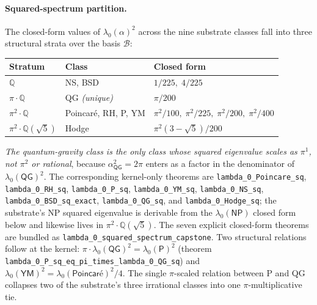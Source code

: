 \documentclass[11pt,a4paper]{amsart}
\theoremstyle{plain}
\theoremstyle{definition}
\begin{document}
\paragraph{Squared-spectrum partition.} The closed-form values of $\lambda_0(\alpha)^2$ across the nine substrate classes fall into three structural strata over the basis $\mathcal{B}$:
\begin{center}
\begin{tabular}{lll}
\toprule
Stratum & Class & Closed form \\
\midrule
$\mathbb{Q}$           & NS, BSD                                       & $1/225,\;4/225$ \\
$\pi\cdot\mathbb{Q}$   & QG \emph{(unique)}                           & $\pi/200$ \\
$\pi^2\cdot\mathbb{Q}$ & Poincar\'e, RH, P, YM                         & $\pi^2/100,\;\pi^2/225,\;\pi^2/200,\;\pi^2/400$ \\
$\pi^2\cdot\mathbb{Q}(\sqrt{5})$ & Hodge                              & $\pi^2(3-\sqrt{5})/200$ \\
\bottomrule
\end{tabular}
\end{center}
\textit{The quantum-gravity class is the only class whose squared eigenvalue scales as $\pi^1$, not $\pi^2$ or rational}, because $\alpha_{\textsf{QG}}^2 = 2\pi$ enters as a factor in the denominator of $\lambda_0(\textsf{QG})^2$. The corresponding kernel-only theorems are \texttt{lambda\_0\_Poincare\_sq}, \texttt{lambda\_0\_RH\_sq}, \texttt{lambda\_0\_P\_sq}, \texttt{lambda\_0\_YM\_sq}, \texttt{lambda\_0\_NS\_sq}, \texttt{lambda\_0\_BSD\_sq\_exact}, \texttt{lambda\_0\_QG\_sq}, and \texttt{lambda\_0\_Hodge\_sq}; the substrate's NP squared eigenvalue is derivable from the $\lambda_0(\textsf{NP})$ closed form below and likewise lives in $\pi^2\cdot\mathbb{Q}(\sqrt{5})$. The seven explicit closed-form theorems are bundled as \texttt{lambda\_0\_squared\_spectrum\_capstone}. Two structural relations follow at the kernel: $\pi \cdot \lambda_0(\textsf{QG})^2 = \lambda_0(\textsf{P})^2$ (theorem \texttt{lambda\_0\_P\_sq\_eq\_pi\_times\_lambda\_0\_QG\_sq}) and $\lambda_0(\textsf{YM})^2 = \lambda_0(\textsf{Poincar\'e})^2/4$. The single $\pi$-scaled relation between P and QG collapses two of the substrate's three irrational classes into one $\pi$-multiplicative tie.
\end{document}
